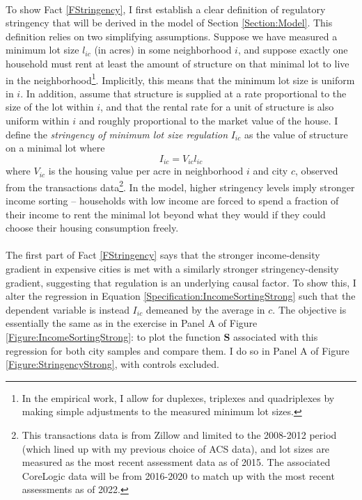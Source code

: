 \documentclass[]{article}
\begin{document}
	\paragraph*{} 
	To show Fact \ref{FStringency}, I first establish a clear definition of regulatory stringency that will be derived in the model of Section \ref{Section:Model}. This definition relies on two simplifying assumptions. Suppose we have measured a minimum lot size $l_{ic}$ (in acres) in some neighborhood $i$, and suppose exactly one household must rent at least the amount of structure on that minimal lot to live in the neighborhood\footnote{In the empirical work, I allow for duplexes, triplexes and quadriplexes by making simple adjustments to the measured minimum lot sizes.}. Implicitly, this means that the minimum lot size is uniform in $i$. In addition, assume that structure is supplied at a rate proportional to the size of the lot within $i$, and that the rental rate for a unit of structure is also uniform within $i$ and roughly proportional to the market value of the house. I define the \textit{stringency of minimum lot size regulation} $I_{ic}$ as the value of structure on a minimal lot  where
	\begin{equation}\label{observedStringency}
		I_{ic} = V_{ic}l_{ic}
	\end{equation}
	where $V_{ic}$ is the housing value per acre in neighborhood $i$ and city $c$, observed from the transactions data\footnote{This transactions data is from Zillow and limited to the 2008-2012 period (which lined up with my previous choice of ACS data), and lot sizes are measured as the most recent assessment data as of 2015. The associated CoreLogic data will be from 2016-2020 to match up with the most recent assessments as of 2022.}. In the model, higher stringency levels imply stronger income sorting -- households with low income are forced to spend a fraction of their income to rent the minimal lot beyond what they would if they could choose their housing consumption freely. 
	
	\paragraph*{}
	The first part of Fact \ref{FStringency} says that the stronger income-density gradient in expensive cities is met with a similarly stronger stringency-density gradient, suggesting that regulation is an underlying causal factor. To show this, I alter the regression in Equation \eqref{Specification:IncomeSortingStrong} such that the dependent variable is instead $I_{ic}$ demeaned by the  average in $c$. The objective is essentially the same as in the exercise in Panel A of Figure \ref{Figure:IncomeSortingStrong}: to plot the function $\mathbf{S}$ associated with this regression for both city samples and compare them. I do so in Panel A of Figure \ref{Figure:StringencyStrong}, with controls excluded. 
	
\end{document}
